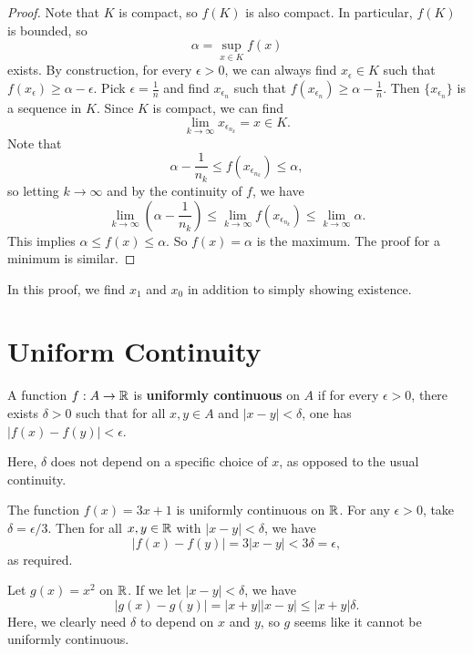 \begin{proof}
  Note that $K$ is compact, so $f(K)$ is also compact.
  In particular, $f(K)$ is bounded, so
  \[\alpha = \sup_{x \in K} f(x)\]
  exists. By construction, for every $\epsilon > 0$,
  we can always find $x_\epsilon \in K$ such that
  $f(x_\epsilon) \ge \alpha - \epsilon$. Pick
  $\epsilon = \frac{1}{n}$ and find $x_{\epsilon_n}$
  such that $f(x_{\epsilon_n}) \ge \alpha - \frac{1}{n}$.
  Then $\{x_{\epsilon_n}\}$ is a sequence in $K$. Since
  $K$ is compact, we can find
  \[\lim_{k \to \infty} x_{\epsilon_{n_k}} = x \in K.\]
  Note that
  \[\alpha - \frac{1}{n_k} \le f(x_{\epsilon_{n_k}}) \le \alpha,\]
  so letting $k \to \infty$ and by the continuity of
  $f$, we have
  \[
    \lim_{k \to \infty} \left(\alpha - \frac{1}{n_k}\right)
    \le \lim_{k \to \infty} f(x_{\epsilon_{n_k}})
    \le \lim_{k \to \infty} \alpha.
  \]
  This implies
  $\alpha \le f(x) \le \alpha$. So $f(x) = \alpha$ is the
  maximum.
  The proof for a minimum is similar.
\end{proof}

\begin{remark}
  In this proof, we find $x_1$ and $x_0$ in addition
  to simply showing existence.
\end{remark}

\section{Uniform Continuity}

\begin{definition}
  A function $f : A \to \mathbb{R}$ is
  \textbf{uniformly continuous} on $A$ if for every
  $\epsilon > 0$, there exists $\delta > 0$ such that
  for all $x, y \in A$ and $|x - y| < \delta$,
  one has $|f(x) - f(y)| < \epsilon$.
\end{definition}

\begin{remark}
  Here, $\delta$ does not depend on a specific choice
  of $x$, as opposed to the usual continuity.
\end{remark}

\begin{example}
  The function $f(x) = 3x + 1$ is uniformly
  continuous on $\mathbb{R}$. For any $\epsilon > 0$, take
  $\delta = \epsilon / 3$. Then for all $x, y \in \mathbb{R}$
  with $|x - y| < \delta$, we have
  \[|f(x) - f(y)| = 3|x - y| < 3\delta = \epsilon,\]
  as required.
\end{example}

\begin{example}
  Let $g(x) = x^2$ on $\mathbb{R}$.
  If we let $|x - y| < \delta$, we have
  \[|g(x) - g(y)| = |x + y||x - y| \le |x + y|\delta.\]
  Here, we clearly need $\delta$ to depend on $x$
  and $y$, so $g$ seems like it cannot be
  uniformly continuous.
\end{example}

